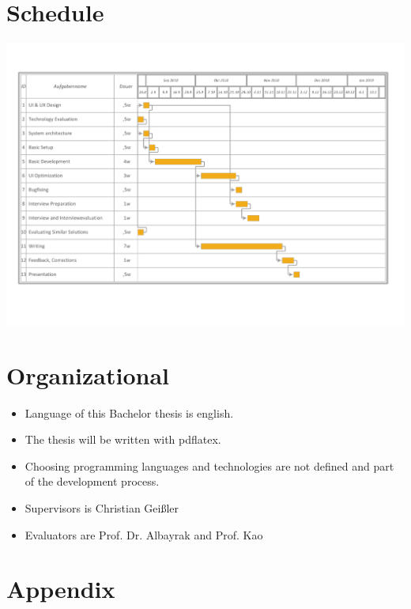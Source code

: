 \documentclass[12pt,a4paper,titlepage,oneside,BCOR1cm]{scrreprt}
\begin{document}
\chapter{Schedule}

\hspace*{-1.5in}
\includegraphics[width=\paperwidth]{gantt-proposal-3.pdf}

\chapter{Organizational}
\begin{itemize}
\item Language of this Bachelor thesis is english.
\item The thesis will be written with pdflatex.
\item Choosing programming languages and technologies are not defined and part of the development process.
\item Supervisors is Christian Geißler
\item Evaluators are Prof. Dr. Albayrak and Prof. Kao
\end{itemize}

\chapter{Appendix}
\newpage

\nocite{*}

\printbibliography
\end{document}

